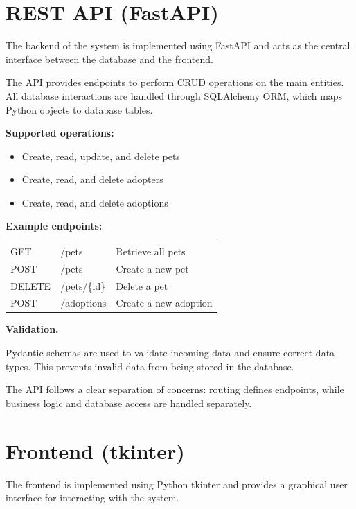 \documentclass[11pt,a4paper]{article}
\begin{document}
\section{REST API (FastAPI)}


The backend of the system is implemented using FastAPI and acts as the central
interface between the database and the frontend.

The API provides endpoints to perform CRUD operations on the main entities.
All database interactions are handled through SQLAlchemy ORM, which maps Python
objects to database tables.

\textbf{Supported operations:}
\begin{itemize}
\item Create, read, update, and delete pets
\item Create, read, and delete adopters
\item Create, read, and delete adoptions
\end{itemize}

\textbf{Example endpoints:}

\begin{tabular}{lll}
GET & /pets & Retrieve all pets \\
POST & /pets & Create a new pet \\
DELETE & /pets/\{id\} & Delete a pet \\
POST & /adoptions & Create a new adoption \\
\end{tabular}

\textbf{Validation.}

Pydantic schemas are used to validate incoming data and ensure correct data types.
This prevents invalid data from being stored in the database.

The API follows a clear separation of concerns: routing defines endpoints, while
business logic and database access are handled separately.

\section{Frontend (tkinter)}


The frontend is implemented using Python tkinter and provides a graphical user
interface for interacting with the system.
\end{document}
